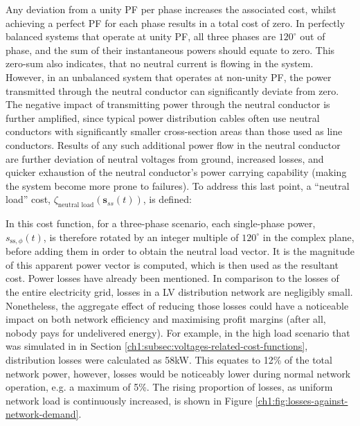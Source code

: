 


Any deviation from a unity PF per phase increases the associated cost, whilst achieving a perfect PF for each phase results in a total cost of zero.
In perfectly balanced systems that operate at unity PF, all three phases are $120^\circ$ out of phase, and the sum of their instantaneous powers should equate to zero.
This zero-sum also indicates, that no neutral current is flowing in the system.
However, in an unbalanced system that operates at non-unity PF, the power transmitted through the neutral conductor can significantly deviate from zero.
The negative impact of transmitting power through the neutral conductor is further amplified, since typical power distribution cables often use neutral conductors with significantly smaller cross-section areas than those used as line conductors.
Results of any such additional power flow in the neutral conductor are further deviation of neutral voltages from ground, increased losses, and quicker exhaustion of the neutral conductor's power carrying capability (making the system become more prone to failures).
To address this last point, a ``neutral load'' cost, $\zeta_\text{neutral load}(\textbf{s}_{ss}(t))$, is defined:



In this cost function, for a three-phase scenario, each single-phase power, $s_{\text{ss},\phi}(t)$, is therefore rotated by an integer multiple of $120^\circ$ in the complex plane, before adding them in order to obtain the neutral load vector.
It is the magnitude of this apparent power vector is computed, which is then used as the resultant cost.
Power losses have already been mentioned.
In comparison to the losses of the entire electricity grid, losses in a LV distribution network are negligibly small.
Nonetheless, the aggregate effect of reducing those losses could have a noticeable impact on both network efficiency and maximising profit margins (after all, nobody pays for undelivered energy).
For example, in the high load scenario that was simulated in in Section \ref{ch1:subsec:voltages-related-cost-functions}, distribution losses were calculated as 58kW.
This equates to 12\% of the total network power, however, losses would be noticeably lower during normal network operation, e.g. a maximum of 5\%.
The rising proportion of losses, as uniform network load is continuously increased, is shown in Figure \ref{ch1:fig:losses-against-network-demand}.

